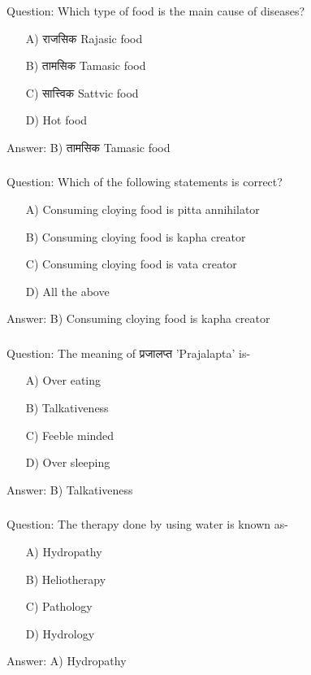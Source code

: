 \begin{frame}[fragile]\frametitle{}

Question: Which type of food is the main cause of diseases?

\begin{itemize}
\item[A)] राजसिक Rajasic food
\item[B)] तामसिक Tamasic food
\item[C)] सात्त्विक Sattvic food
\item[D)] Hot food
\end{itemize}

Answer: B) तामसिक Tamasic food
\end{frame}


\begin{frame}[fragile]\frametitle{}

Question: Which of the following statements is correct?

\begin{itemize}
\item[A)] Consuming cloying food is pitta annihilator
\item[B)] Consuming cloying food is kapha creator
\item[C)] Consuming cloying food is vata creator
\item[D)] All the above
\end{itemize}

Answer: B) Consuming cloying food is kapha creator
\end{frame}

\begin{frame}[fragile]\frametitle{}

Question: The meaning of प्रजालप्त 'Prajalapta' is-

\begin{itemize}
\item[A)] Over eating
\item[B)] Talkativeness
\item[C)] Feeble minded
\item[D)] Over sleeping
\end{itemize}

Answer: B) Talkativeness
\end{frame}

\begin{frame}[fragile]\frametitle{}

Question: The therapy done by using water is known as-

\begin{itemize}
\item[A)] Hydropathy
\item[B)] Heliotherapy
\item[C)] Pathology
\item[D)] Hydrology
\end{itemize}

Answer: A) Hydropathy
\end{frame}

